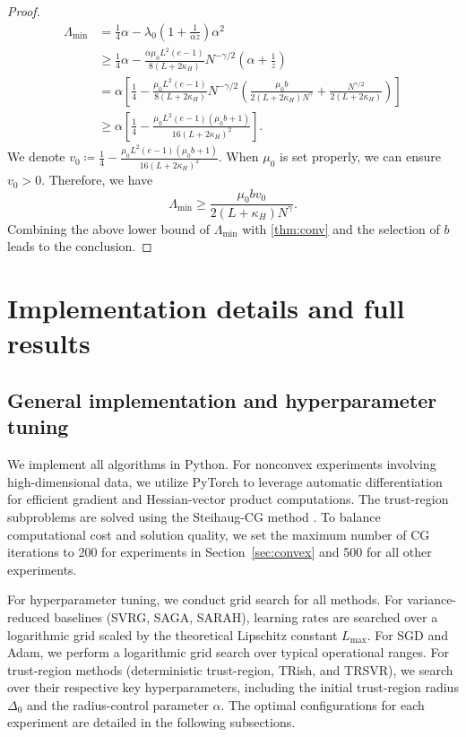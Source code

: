 \documentclass{article}
\theoremstyle{plain}
\theoremstyle{definition}
\theoremstyle{remark}
\begin{document}
\begin{proof}
\begin{align*}
    \Lambda_{\min} & =  \frac{1}{4}\alpha - \lambda_{0}\left(1+\frac{1}{\alpha z}\right)\alpha^2\\
    & \geq \frac{1}{4}\alpha - \frac{\alpha\mu_0 L^2(e-1)}{8(L+2\kappa_H) }N^{-\gamma/2}\left(\alpha+\frac{1}{ z}\right)\\
    & = \alpha \left[\frac{1}{4} - \frac{\mu_0 L^2(e-1)}{8(L+2\kappa_H) }N^{-\gamma/2}\left(\frac{\mu_0 b}{2(L+2\kappa_H)N^\gamma}+\frac{N^{\gamma/2}}{2(L+2\kappa_H)}\right)\right]\\
    & \geq \alpha \left[\frac{1}{4} - \frac{\mu_0 L^2(e-1)(\mu_0 b+1)}{16(L+2\kappa_H)^2 }\right].
\end{align*}
We denote $v_0\coloneqq \frac{1}{4} - \frac{\mu_0 L^2(e-1)(\mu_0 b+1)}{16(L+2\kappa_H)^2 }$. When $\mu_0$ is set properly, we can ensure $v_0 > 0$. Therefore, we have
\begin{equation*}
  \Lambda_{\min} \geq \frac{\mu_0bv_0}{2(L+\kappa_H)N^{\gamma}}.  
\end{equation*}
Combining the above lower bound of $\Lambda_{\min}$ with \eqref{thm:conv} and the selection of $b$ leads to the conclusion.
\end{proof}








\section{Implementation details and full results}\label{append_C}

\subsection{General implementation and hyperparameter tuning}

We implement all algorithms in Python. For nonconvex experiments involving high-dimensional data, we utilize PyTorch to leverage automatic differentiation for efficient gradient and Hessian-vector product computations. The trust-region subproblems are solved using the Steihaug-CG method \citep[][Algorithm 7.2]{Nocedal2006Numerical}. To balance computational cost and solution quality, we set the maximum number of CG iterations to 200 for experiments in Section~\ref{sec:convex} and 500 for all other experiments.

For hyperparameter tuning, we conduct grid search for all methods. For variance-reduced baselines (SVRG, SAGA, SARAH), learning rates are searched over a logarithmic grid scaled by the theoretical Lipschitz constant $L_{\max}$. For SGD and Adam, we perform a logarithmic grid search over typical operational ranges. For trust-region methods (deterministic trust-region, TRish, and TRSVR), we search over their respective key hyperparameters, including the initial trust-region radius $\Delta_0$ and the radius-control parameter $\alpha$. The optimal configurations for each experiment are detailed in the following subsections.
\end{document}
